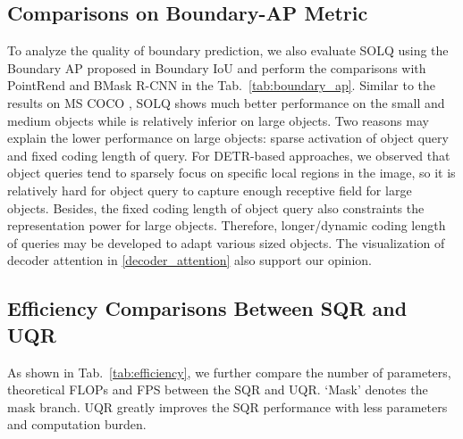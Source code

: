 \documentclass{article}
\begin{document}
\subsection{Comparisons on Boundary-AP Metric}
\label{boundary_results}
To analyze the quality of boundary prediction, we also evaluate SOLQ using the Boundary AP proposed in Boundary IoU \cite{cheng2021boundaryiou} and perform the comparisons with PointRend \cite{kirillov2020pointrend} and BMask R-CNN \cite{cheng2020bmaskrcnn} in the Tab.~\ref{tab:boundary_ap}. Similar to the results on MS COCO \cite{lin2014microsoft}, SOLQ shows much better performance on the small and medium objects while is relatively inferior on large objects. Two reasons may explain the lower performance on large objects: sparse activation of object query and fixed coding length of query. For DETR-based approaches, we observed that object queries tend to sparsely focus on specific local regions in the image, so it is relatively hard for object query to capture enough receptive field for large objects. Besides, the fixed coding length of object query also constraints the representation power for large objects. Therefore, longer/dynamic coding length of queries may be developed to adapt various sized objects. The visualization of decoder attention in \ref{decoder_attention} also support our opinion.\vspace{-0.1cm}

\begin{table*}[h]
\caption{Performance comparisons under the Boundary-AP metric on COCO 2017 \textit{val} set.}
\vspace{-0.3cm}
\center
{}
\label{tab:boundary_ap}
\end{table*}

\subsection{Efficiency Comparisons Between SQR and UQR}
\label{effciency_compare}
As shown in Tab.~\ref{tab:efficiency}, we further compare the number of parameters, theoretical FLOPs and FPS between the SQR and UQR. `Mask' denotes the mask branch. UQR greatly improves the SQR performance with less parameters and computation burden.\vspace{-0.1cm}
\end{document}
